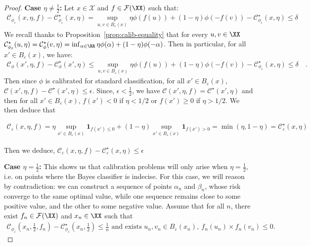 \begin{proof}
\textbf{Case $\eta\neq \frac12$:} Let $x\in\mathcal{X}$ and $f\in \mathcal{F}(\XX)$ such that: 
\begin{align*}
\mathcal{C}_{\phi_\varepsilon}(x,\eta,f) - \mathcal{C}_{\phi_\varepsilon}^\star(x,\eta)
 = \sup_{u,v\in B_\varepsilon(x)}\eta\phi (f(u))+(1-\eta)\phi (-f(v))-\mathcal{C}_{\phi_\varepsilon}^\star(x,\eta)\leq \delta 
\end{align*}
We recall thanks to Proposition~\ref{prop:calib-equality} that for every $u,v\in\XX$ 
$\mathcal{C}_{\phi_\varepsilon}^\star(u,\eta) =\mathcal{C}_\phi^\star(v,\eta)=\inf_{\alpha\in\RR}\eta \phi(\alpha)+(1-\eta)\phi(-\alpha)$. Then in particular, for all $x'\in B_\varepsilon(x)$, we have:
\begin{align*}
    \mathcal{C}_{\phi}(x',\eta,f) - \mathcal{C}_{\phi}^\star(x',\eta)\leq \sup_{u,v\in B_\varepsilon(x)}\eta\phi (f(u))+(1-\eta)\phi (-f(v))-\mathcal{C}_{\phi_\varepsilon}^\star(x,\eta)\leq \delta\quad.
\end{align*} 
Then since $\phi$ is calibrated for standard classification, for all $x'\in B_\varepsilon(x)$, $\mathcal{C}(x',\eta,f) - \mathcal{C}^\star(x',\eta)\leq \epsilon$. Since,  $\epsilon<\frac{1}{2}$, we have $\mathcal{C}(x',\eta,f) = \mathcal{C}^\star(x',\eta)$ and then for all $x'\in B_\varepsilon(x)$, $f(x')< 0$  if $\eta<1/2$ or $f(x')\geq0$  if $\eta>1/2$. We then deduce that 

\begin{align*}
   \mathcal{C}_{\varepsilon}(x,\eta,f) = \eta \sup_{x'\in B_\varepsilon(x)} \mathbf{1}_{f(x')\leq 0 } +(1-\eta) \sup_{x'\in B_\varepsilon(x)} \mathbf{1}_{f(x')> 0 }
    = \min(\eta,1-\eta)
    = \mathcal{C}_{\varepsilon}^\star(x,\eta)
\end{align*}


Then we deduce, $\mathcal{C}_{\varepsilon}(x,\eta,f) - \mathcal{C}_{\varepsilon}^\star(x,\eta)\leq \epsilon$



\textbf{Case $\eta=\frac12$:} This shows us that calibration problems will only arise when $\eta = \frac{1}{2}$, i.e. on points where the Bayes classifier is indecise. For this case, we will reason by contradiction: we can construct a sequence of points $\alpha_n$ and $\beta_n$, whose risk converge to the same optimal value, while one sequence remains close to some positive value, and the other to some negative value. Assume that for all $n$, there exist $f_n\in\mathcal{F}(\XX)$ and $x_n\in\XX$ such that 
\begin{align*}
    \mathcal{C}_{\phi_\varepsilon}(x_n,\frac12,f_n) - \mathcal{C}_{\phi_\varepsilon}^\star(x_n,\frac12)\leq \frac1n\text{ and exists $u_n,v_n\in B_\varepsilon(x_n)$},~ f_n(u_n)\times f_n(v_n)\leq 0.
\end{align*}


\end{proof}
